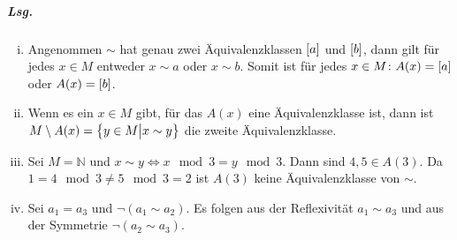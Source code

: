 \documentclass{scrreprt}
\begin{document}
\begin{enumerate}[(a)]
  \subparagraph{Lsg.}
  \begin{enumerate}[(i)]
  \item Angenommen $\sim$ hat genau zwei Äquivalenzklassen $\qty[a]$ und
    $\qty[b]$, dann gilt für jedes $x \in M$ entweder $x \sim a$ oder
    $x \sim b$.
    Somit ist für jedes $x \in M \colon A(x) = \qty[a]$ oder $A(x) = \qty[b]$.

  \item Wenn es ein $x \in M$ gibt, für das $A(x)$ eine Äquivalenzklasse ist,
    dann ist $M \setminus A(x) = \qty{y \in M {\big |} x \sim y}$ die zweite
    Äquivalenzklasse.

  \item Sei $M = \mathbb{N}$ und $x \sim y \iff x \mod 3 = y \mod 3$.
    Dann sind $4, 5 \in A(3)$.
    Da $1 = 4 \mod 3 \ne 5 \mod 3 = 2$ ist $A(3)$ keine Äquivalenzklasse von
    $\sim$.
  \item Sei $a_1 = a_3$ und $\neg (a_1 \sim a_2)$.
    Es folgen aus der Reflexivität $a_1 \sim a_3$ und aus der Symmetrie
    $\neg(a_2 \sim a_3)$.
  \end{enumerate}
\end{enumerate}
\end{document}
